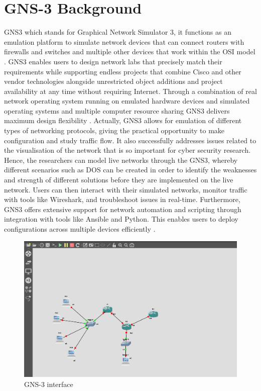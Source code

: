 \section{GNS-3 Background}
GNS3 which stands for Graphical Network Simulator 3, it functions as an emulation platform to simulate network devices that can connect routers with firewalls and switches and multiple other devices that work within the OSI model \cite{article}. GNS3 enables users to design network labs that precisely match their requirements while supporting endless projects that combine Cisco and other vendor technologies alongside unrestricted object additions and project availability at any time without requiring Internet. Through a combination of real network operating system running on emulated hardware devices and simulated operating systems and multiple computer resource sharing GNS3 delivers maximum design flexibility \cite{fomin2017gns3}. Actually, GNS3 allows for emulation of different types of networking protocols, giving the practical opportunity to make configuration and study traffic flow. It also successfully addresses issues related to the visualisation of the network that is so important for cyber security research. Hence, the researchers can model live networks through the GNS3, whereby different scenarios such as DOS can be created in order to identify the weaknesses and strength of different solutions before they are implemented on the live network. Users can then interact with their simulated networks, monitor traffic with tools like Wireshark, and troubleshoot issues in real-time. Furthermore, GNS3 offers extensive support for network automation and scripting through integration with tools like Ansible and Python. This enables users to deploy configurations across multiple devices efficiently \cite{neumann2015book}.
\begin{figure}[!htb]
    \centering
    \includegraphics[width=0.8\linewidth]{thesis/gns3.png}
    \caption{GNS-3 interface}
    \label{fig:enter-label}
\end{figure}
